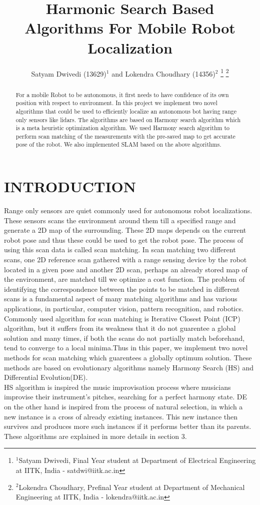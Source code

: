 \documentclass[letterpaper, 10 pt, conference]{ieeeconf}  %
\title{\LARGE \bf
Harmonic Search Based Algorithms For Mobile Robot Localization
}
\author{Satyam Dwivedi (13629)$^{1}$ and Lokendra Choudhary (14356)$^{2}$%
\thanks{$^{1}$Satyam Dwivedi, Final Year student at Department of Electrical Engineering at IITK, India    -    satdwi@iitk.ac.in
        }%
\thanks{$^{2}$Lokendra Choudhary, Prefinal Year student at Department of Mechanical Engineering at IITK, India  -  lokendra@iitk.ac.in
        }%
}
\begin{document}
\maketitle
\thispagestyle{empty}
\pagestyle{empty}


\begin{abstract}
For a mobile Robot to be autonomous, it first needs to have confidence of its own position with respect to environment. In this project we implement two novel algorithms that could be used to efficiently localize an autonomous bot having range only sensors like lidars. The algorithms are based on Harmony search algorithm which is a meta heuristic optimization algorithm. We used Harmony search algorithm to perform scan matching of the measurements with the pre-saved map to get accurate pose of the robot. We also implemented SLAM based on the above algorithms.
\end{abstract}


\section{INTRODUCTION}
Range only sensors are quiet commonly used for autonomous robot localizations. These sensors scans the environment around them till a specified range and generate a 2D map of the surrounding. These 2D maps depends on the current robot pose and thus these could be used to get the robot pose. The process of using this scan data is called scan matching. In scan matching two different scans, one 2D reference scan gathered with a range sensing device by the robot located in a given pose and another 2D scan, perhaps an already stored map of the environment, are matched till we optimize a cost function. The problem of identifying the correspondence between the points to be matched in different scans is a fundamental aspect of many matching algorithms and has various applications, in particular, computer vision, pattern recognition, and robotics. Commonly used algorithm for scan matching is Iterative Closest Point (ICP) algorithm, but it suffers from its weakness that it do not guarentee a global solution and many times, if both the scans do not partially match beforehand, tend to converge to a local minima.Thus in this paper, we implement two novel methods for scan matching which guarentees a globally optimum solution. These methods are based on evolutionary algorithms namely Harmony Search (HS) and Differential Evolution(DE). \\
\indent HS algorithm is inspired the music improvisation process where musicians improvise their instrument's pitches, searching for a perfect harmony state. DE on the other hand is inspired from the process of natural selection, in which a new instance is a cross of already existing instances. This new instance then survives and produces more such instances if it performs better than its parents. These algorithms are explained in more details in section 3.
\end{document}
